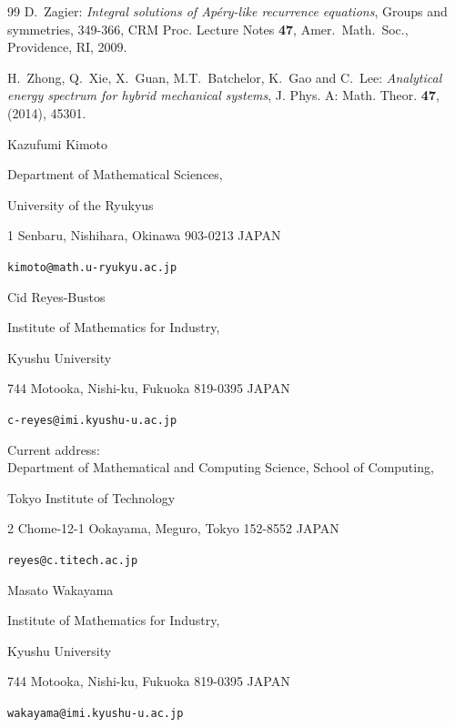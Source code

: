 \documentclass[11pt]{article}
\numberwithin{equation}{section}
\theoremstyle{plain}
\theoremstyle{definition}
\theoremstyle{remark}
\begin{document}
\begin{thebibliography}{99}
  D.~Zagier:
  \textit{Integral solutions of Ap\'ery-like recurrence equations},
  Groups and symmetries, 349-366, CRM Proc. Lecture Notes \textbf{47},
  Amer.~Math.~Soc., Providence, RI, 2009.

  H.~Zhong, Q.~Xie, X.~Guan, M.T.~Batchelor, K.~Gao and C.~Lee:
  \textit{Analytical energy spectrum for hybrid mechanical systems},
  J. Phys.  A: Math. Theor. \textbf{47}, (2014), 45301.


\end{thebibliography}


\begin{flushleft}
\bigskip

Kazufumi Kimoto \par
Department of Mathematical Sciences, \par
University of the Ryukyus \par
1 Senbaru, Nishihara, Okinawa 903-0213 JAPAN \par
\texttt{kimoto@math.u-ryukyu.ac.jp} \par

\bigskip

Cid Reyes-Bustos \par
Institute of Mathematics for Industry,\par
Kyushu University \par
744 Motooka, Nishi-ku, Fukuoka 819-0395 JAPAN \par
\texttt{c-reyes@imi.kyushu-u.ac.jp} 

\medskip

Current address: \\
Department of Mathematical and Computing Science, School of Computing, \par
Tokyo Institute of Technology \par
2 Chome-12-1 Ookayama, Meguro, Tokyo 152-8552 JAPAN \par\par
\texttt{reyes@c.titech.ac.jp}

\bigskip

Masato Wakayama \par
Institute of Mathematics for Industry,\par
Kyushu University \par
744 Motooka, Nishi-ku, Fukuoka 819-0395 JAPAN \par
\texttt{wakayama@imi.kyushu-u.ac.jp}
\end{flushleft}
\end{document}
